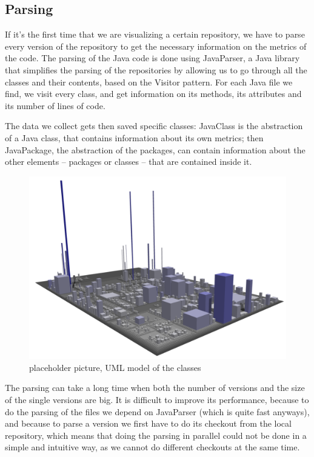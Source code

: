 \documentclass[]{usiinfbachelorproject}
\begin{document}
\subsection{Parsing} \label{Parsing}
If it's the first time that we are visualizing a certain repository, we have to parse every version of the repository to get the necessary information on the metrics of the code.
The parsing of the Java code is done using JavaParser, a Java library that simplifies the parsing of the repositories by allowing us to go through all the classes and their contents, based on the Visitor pattern.
For each Java file we find, we visit every class, and get information on its methods, its attributes and its number of lines of code.

The data we collect gets then saved specific classes: JavaClass is the abstraction of a Java class, that contains information about its own metrics; then JavaPackage, the abstraction of the packages, can contain information about the other elements -- packages or classes -- that are contained inside it.

\begin{figure} [H]
\centering
\includegraphics[width=.5\textwidth]{pictures/example.png}
\caption{placeholder picture, UML model of the classes}
\label{fig:flow}
\end{figure}

The parsing can take a long time when both the number of versions and the size of the single versions are big.
It is difficult to improve its performance, because to do the parsing of the files we depend on JavaParser (which is quite fast anyways), and because to parse a version we first have to do its checkout from the local repository, which means that doing the parsing in parallel could not be done in a simple and intuitive way, as we cannot do different checkouts at the same time.
\end{document}
